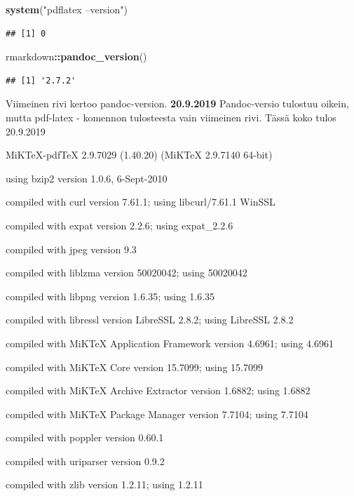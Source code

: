 \documentclass[
  finnish,
]{book}
\newenvironment{Shaded}{\begin{snugshade}}{\end{snugshade}}
\newcommand{\KeywordTok}[1]{\textcolor[rgb]{0.13,0.29,0.53}{\textbf{#1}}}
\newcommand{\NormalTok}[1]{#1}
\newcommand{\OperatorTok}[1]{\textcolor[rgb]{0.81,0.36,0.00}{\textbf{#1}}}
\newcommand{\StringTok}[1]{\textcolor[rgb]{0.31,0.60,0.02}{#1}}
\begin{document}
\begin{Shaded}
\begin{Highlighting}[]
\KeywordTok{system}\NormalTok{(}\StringTok{"pdflatex --version"}\NormalTok{)}
\end{Highlighting}
\end{Shaded}

\begin{verbatim}
## [1] 0
\end{verbatim}

\begin{Shaded}
\begin{Highlighting}[]
\NormalTok{rmarkdown}\OperatorTok{::}\KeywordTok{pandoc_version}\NormalTok{()}
\end{Highlighting}
\end{Shaded}

\begin{verbatim}
## [1] '2.7.2'
\end{verbatim}

Viimeinen rivi kertoo pandoc-version.
\textbf{20.9.2019} Pandoc-versio tulostuu oikein, mutta pdf-latex - komennon tulosteesta
vain viimeinen rivi. Tässä koko tulos 20.9.2019

MiKTeX-pdfTeX 2.9.7029 (1.40.20) (MiKTeX 2.9.7140 64-bit)

using bzip2 version 1.0.6, 6-Sept-2010

compiled with curl version 7.61.1; using libcurl/7.61.1 WinSSL

compiled with expat version 2.2.6; using expat\_2.2.6

compiled with jpeg version 9.3

compiled with liblzma version 50020042; using 50020042

compiled with libpng version 1.6.35; using 1.6.35

compiled with libressl version LibreSSL 2.8.2; using LibreSSL 2.8.2

compiled with MiKTeX Application Framework version 4.6961; using 4.6961

compiled with MiKTeX Core version 15.7099; using 15.7099

compiled with MiKTeX Archive Extractor version 1.6882; using 1.6882

compiled with MiKTeX Package Manager version 7.7104; using 7.7104

compiled with poppler version 0.60.1

compiled with uriparser version 0.9.2

compiled with zlib version 1.2.11; using 1.2.11
\end{document}
